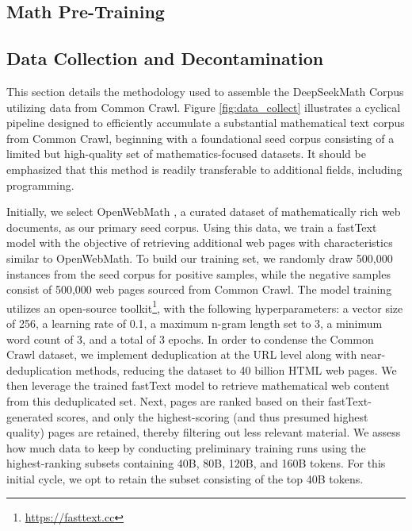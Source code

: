 \begin{itemize}[topsep=0pt]
\section{Math Pre-Training}

\subsection{Data Collection and Decontamination} This section details the methodology used to assemble the DeepSeekMath Corpus utilizing data from Common Crawl. Figure \ref{fig:data_collect} illustrates a cyclical pipeline designed to efficiently accumulate a substantial mathematical text corpus from Common Crawl, beginning with a foundational seed corpus consisting of a limited but high-quality set of mathematics-focused datasets. It should be emphasized that this method is readily transferable to additional fields, including programming.

Initially, we select OpenWebMath \citep{openwebmath}, a curated dataset of mathematically rich web documents, as our primary seed corpus. Using this data, we train a fastText model \citep{joulin2016fasttext} with the objective of retrieving additional web pages with characteristics similar to OpenWebMath. To build our training set, we randomly draw 500,000 instances from the seed corpus for positive samples, while the negative samples consist of 500,000 web pages sourced from Common Crawl. The model training utilizes an open-source toolkit\footnote{\url{https://fasttext.cc}}, with the following hyperparameters: a vector size of 256, a learning rate of 0.1, a maximum n-gram length set to 3, a minimum word count of 3, and a total of 3 epochs. In order to condense the Common Crawl dataset, we implement deduplication at the URL level along with near-deduplication methods, reducing the dataset to 40 billion HTML web pages. We then leverage the trained fastText model to retrieve mathematical web content from this deduplicated set. Next, pages are ranked based on their fastText-generated scores, and only the highest-scoring (and thus presumed highest quality) pages are retained, thereby filtering out less relevant material. We assess how much data to keep by conducting preliminary training runs using the highest-ranking subsets containing 40B, 80B, 120B, and 160B tokens. For this initial cycle, we opt to retain the subset consisting of the top 40B tokens.


\end{itemize}
